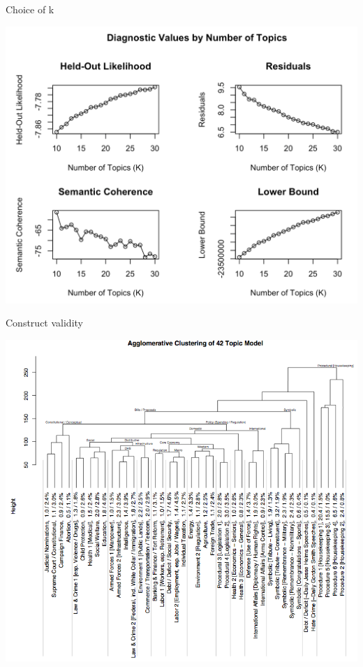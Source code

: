 \documentclass{hertieteaching}
\begin{document}
\begin{frame}{Choice of k}


\centerline{\includegraphics[scale=0.4]{pictures/heldout-lda}}

\end{frame}

\begin{frame}{Construct validity}

\centerline{\includegraphics[scale=0.4]{pictures/topic-clustering}}

\end{frame}
\end{document}
